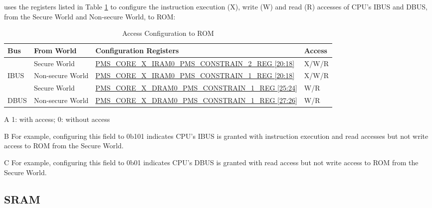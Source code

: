\documentclass[main\_\_EN.tex]{subfiles}
\begin{document}
\chipname{} uses the registers listed in Table  \ref{tab:permctrl-rom_permconfig} to configure the instruction execution (X), write (W) and read (R) accesses of CPU's IBUS and DBUS, from the Secure World and Non-secure World, to ROM:

\begin{table}[H]
    \centering
    \caption{Access Configuration to ROM}
    \label{tab:permctrl-rom_permconfig}
    \begin{threeparttable}
    \begin{tabular}{|l|l|l|l|}
        \hline
        \rowcolor{lightgray}
        \textbf{Bus} & \textbf{From World} & \textbf{Configuration Registers\tnote{A}}                         & \textbf{Access} \\ \hline
                     & Secure World      & \hyperref[regdesc:PMSCOREXIRAM0PMSCONSTRAIN2REG]{PMS\_CORE\_X\_IRAM0\_PMS\_CONSTRAIN\_2\_REG   {[}20:18{]}}\tnote{B} & X/W/R           \\ \cline{2-4}
        \multirow{-2}{*}{IBUS} & Non-secure World & \hyperref[regdesc:PMSCOREXIRAM0PMSCONSTRAIN1REG]{PMS\_CORE\_X\_IRAM0\_PMS\_CONSTRAIN\_1\_REG {[}20:18{]}}    & X/W/R \\ \hline
                     & Secure World      & \hyperref[regdesc:PMSCOREXDRAM0PMSCONSTRAIN1REG]{PMS\_CORE\_X\_DRAM0\_PMS\_CONSTRAIN\_1\_REG   {[}25:24{]}}\tnote{C} & W/R             \\ \cline{2-4}
        \multirow{-2}{*}{DBUS} & Non-secure World & \hyperref[regdesc:PMSCOREXDRAM0PMSCONSTRAIN1REG]{PMS\_CORE\_X\_DRAM0\_PMS\_CONSTRAIN\_1\_REG   {[}27:26{]}} & W/R   \\ \hline
        \end{tabular}
        \begin{tablenotes}
        \item[A] 1: with access; 0: without access
        \item[B] For example, configuring this field to 0b101 indicates CPU's IBUS is granted with instruction execution and read accesses but not write access to ROM from the Secure World.
        \item[C] For example, configuring this field to 0b01 indicates CPU's DBUS is granted with read access but not write access to ROM from the Secure World.
        \end{tablenotes}
     \end{threeparttable}
    \end{table}

\subsection{SRAM}
\end{document}

